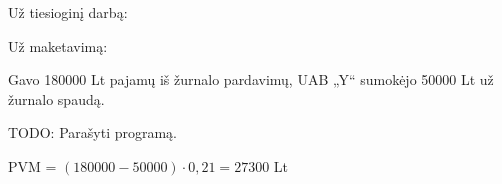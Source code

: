 \begin{tasks}
\begin{task}
\begin{subtask}
\begin{solution}
        Už tiesioginį darbą:

        
        Už maketavimą:


      \end{solution}
    \end{subtask}
    \begin{subtask}
      \begin{condition}
        Gavo 180000 Lt pajamų iš žurnalo pardavimų, UAB „Y“
        sumokėjo 50000 Lt už žurnalo spaudą.
      \end{condition}
      \begin{solution}
        TODO: Parašyti programą.

        PVM = $(180000 - 50000)\cdot 0,21 = 27300$ Lt
      \end{solution}
    \end{subtask}
  \end{task}

\end{tasks}
